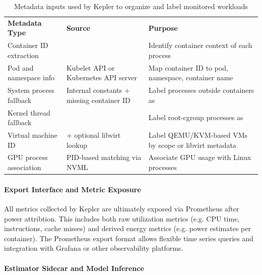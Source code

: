 \begin{table}[h]
    \small
    \centering
    \begin{tabular}{ |L{4.5cm} | L{5cm} | L{4.5cm}| } 
        \hline
        \textbf{Metadata Type} & \textbf{Source} & \textbf{Purpose} \\
        \Xhline{1.5pt}
        Container ID extraction &  & Identify container context of each process \\
        \hline
        Pod and namespace info & Kubelet API or Kubernetes API server & Map container ID to pod, namespace, container name \\
        \hline
        System process fallback & Internal constants + missing container ID & Label processes outside containers as  \\
        \hline
        Kernel thread fallback &  & Label root-cgroup processes as  \\
        \hline
        Virtual machine ID &  + optional libvirt lookup & Label QEMU/KVM-based VMs by scope or libvirt metadata \\
        \hline
        GPU process association & PID-based matching via NVML & Associate GPU usage with Linux processes \\
        \hline
    \end{tabular}
    \caption[Metadata inputs used by Kepler]{Metadata inputs used by Kepler to organize and label monitored workloads}
    \label{tab:kepler-metadata-inputs}
\end{table}

\paragraph{Export Interface and Metric Exposure}

All metrics collected by Kepler are ultimately exposed via Prometheus after power attribtion. This includes both raw utilization metrics (e.g. CPU time, instructions, cache misses) and derived energy metrics (e.g. power estimates per container). The Prometheus export format allows flexible time series queries and integration with Grafana or other observability platforms.

\paragraph{Estimator Sidecar and Model Inference}


